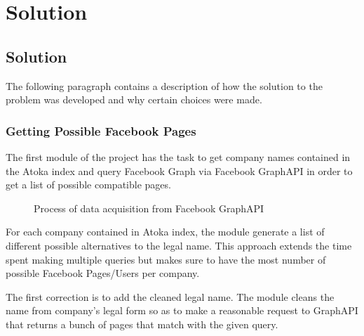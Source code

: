 \chapter{Solution} 

\section{Solution}
The following paragraph contains a description of how the solution to the problem was developed and why certain choices were made.

\subsection{Getting Possible Facebook Pages}

The first module of the project has the task to get company names contained in the Atoka index and query Facebook Graph via Facebook GraphAPI in order to get a list of possible compatible pages.

\begin{figure}
\centering
{}
    \caption{Process of data acquisition from Facebook GraphAPI}
    \label{Fig.2}
\end{figure}

For each company contained in Atoka index, the module generate a list of different possible alternatives to the legal name. This approach extends the time spent making multiple queries but makes sure to have the most number of possible Facebook Pages/Users per company. 

The first correction is to add the cleaned legal name. The  module cleans the name from company's legal form so as to make a reasonable request to GraphAPI that returns a bunch of pages that match with the given query.

